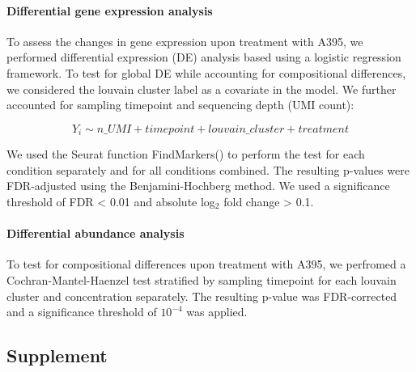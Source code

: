 \paragraph{Differential gene expression analysis}
To assess the changes in gene expression upon treatment with A395, we performed differential expression (DE) analysis based using a logistic regression framework. To test for global DE while accounting for compositional differences, we considered the louvain cluster label as a covariate in the model. We further accounted for sampling timepoint and sequencing depth (UMI count):

\[ Y_i \sim n\_UMI + timepoint + louvain\_cluster + treatment \]

We used the Seurat function FindMarkers() to perform the test for each condition separately and for all conditions combined. The resulting p-values were FDR-adjusted using the Benjamini-Hochberg method. We used a significance threshold of FDR < 0.01 and absolute log$_2$ fold change > 0.1.


\paragraph{Differential abundance analysis}
To test for compositional differences upon treatment with A395, we perfromed a Cochran-Mantel-Haenzel test stratified by sampling timepoint for each louvain cluster and concentration separately. The resulting p-value was FDR-corrected and a significance threshold of $10^{-4}$ was applied.








\clearpage

\subsection{Supplement}
\beginsupplement

